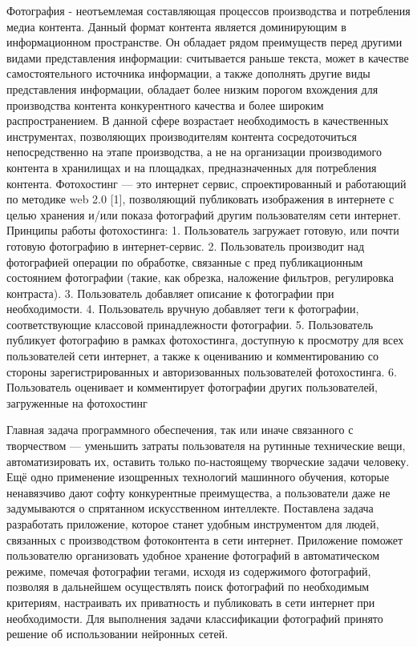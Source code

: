 
Фотография - неотъемлемая составляющая процессов производства и потребления медиа контента.
Данный формат контента является доминирующим в информационном пространстве. Он обладает рядом преимуществ перед другими видами представления информации: считывается раньше текста, может в качестве самостоятельного источника информации, а также дополнять другие виды представления информации, обладает более низким порогом вхождения для производства контента конкурентного качества и более широким распространением.
В данной сфере возрастает необходимость в качественных инструментах, позволяющих производителям контента сосредоточиться непосредственно на этапе производства, а не на организации производимого контента в хранилищах и на площадках, предназначенных для потребления контента.
Фотохостинг — это интернет сервис, спроектированный и работающий по методике web 2.0 [1], позволяющий публиковать изображения в интернете с целью хранения и/или показа фотографий другим пользователям сети интернет.
Принципы работы фотохостинга:
1.	Пользователь загружает готовую, или почти готовую фотографию в интернет-сервис.
2.	Пользователь производит над фотографией операции по обработке, связанные с пред публикационным состоянием фотографии (такие, как обрезка, наложение фильтров, регулировка контраста).
3.	Пользователь добавляет описание к фотографии при необходимости.
4.	Пользователь вручную добавляет теги к фотографии, соответствующие классовой принадлежности фотографии.
5.	Пользователь публикует фотографию в рамках фотохостинга, доступную к просмотру для всех пользователей сети интернет, а также к оцениванию и комментированию со стороны зарегистрированных и авторизованных пользователей фотохостинга.
6.	Пользователь оценивает и комментирует фотографии других пользователей, загруженные на фотохостинг

Главная задача программного обеспечения, так или иначе связанного с творчеством — уменьшить затраты пользователя на рутинные технические вещи, автоматизировать их, оставить только по-настоящему творческие задачи человеку.
Ещё одно применение изощренных технологий машинного обучения, которые ненавязчиво дают софту конкурентные преимущества, а пользователи даже не задумываются о спрятанном искусственном интеллекте.
Поставлена задача разработать приложение, которое станет удобным инструментом для людей, связанных с производством фотоконтента в сети интернет. Приложение поможет пользователю организовать удобное хранение фотографий в автоматическом режиме, помечая фотографии тегами, исходя из содержимого фотографий, позволяя в дальнейшем осуществлять поиск фотографий по необходимым критериям, настраивать их приватность и публиковать в сети интернет при необходимости. Для выполнения задачи классификации фотографий принято решение об использовании нейронных сетей.

\clearpage